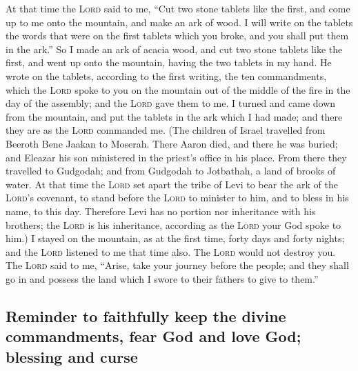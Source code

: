  At that time the \textsc{Lord} said to me, ``Cut two
stone tablets like the first, and come up to me onto the mountain, and
make an ark of wood.  I will write on the tablets the
words that were on the first tablets which you broke, and you shall put
them in the ark.''  So I made an ark of acacia wood, and
cut two stone tablets like the first, and went up onto the mountain,
having the two tablets in my hand.  He wrote on the
tablets, according to the first writing, the ten commandments, which the
\textsc{Lord} spoke to you on the mountain out of the middle of the fire
in the day of the assembly; and the \textsc{Lord} gave them to me.
 I turned and came down from the mountain, and put the
tablets in the ark which I had made; and there they are as the
\textsc{Lord} commanded me.  (The children of Israel
travelled from Beeroth Bene Jaakan to Moserah. There Aaron died, and
there he was buried; and Eleazar his son ministered in the priest's
office in his place.  From there they travelled to
Gudgodah; and from Gudgodah to Jotbathah, a land of brooks of water.
 At that time the \textsc{Lord} set apart the tribe of
Levi to bear the ark of the \textsc{Lord}'s covenant, to stand before
the \textsc{Lord} to minister to him, and to bless in his name, to this
day.  Therefore Levi has no portion nor inheritance with
his brothers; the \textsc{Lord} is his inheritance, according as the
\textsc{Lord} your God spoke to him.)  I stayed on the
mountain, as at the first time, forty days and forty nights; and the
\textsc{Lord} listened to me that time also. The \textsc{Lord} would not
destroy you.  The \textsc{Lord} said to me, ``Arise, take
your journey before the people; and they shall go in and possess the
land which I swore to their fathers to give to them.''

\hypertarget{reminder-to-faithfully-keep-the-divine-commandments-fear-god-and-love-god-blessing-and-curse}{%
\subsection{Reminder to faithfully keep the divine commandments, fear
God and love God; blessing and
curse}\label{reminder-to-faithfully-keep-the-divine-commandments-fear-god-and-love-god-blessing-and-curse}}

